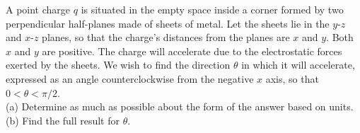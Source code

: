 A point charge $q$ is situated in the empty space inside a corner formed
by two perpendicular half-planes made of sheets of metal. Let the sheets
lie in the $y$-$z$ and $x$-$z$ planes, so that the charge's distances
from the planes are $x$ and $y$. Both $x$ and $y$ are positive. The charge will
accelerate due to the electrostatic forces exerted by the sheets.
We wish to find the direction $\theta$ in which it will accelerate, expressed
as an angle counterclockwise from the negative $x$ axis, so that $0<\theta<\pi/2$.\\
(a) Determine as much as possible about the form of the answer based
on units.\hwendpart
(b) Find the full result for $\theta$.\answercheck\hwendpart
